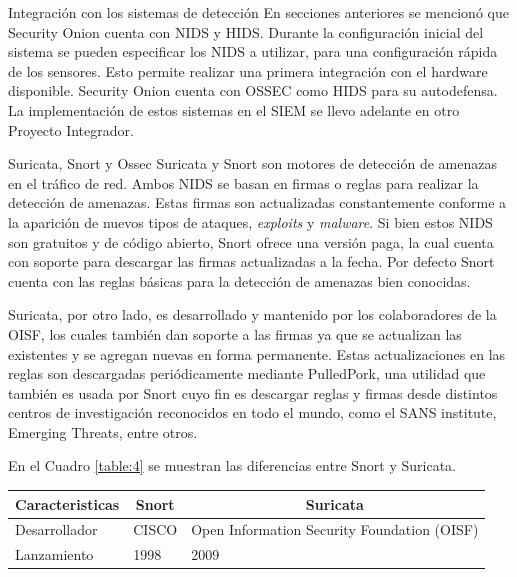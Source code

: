    \begin{section}{Integración con los sistemas de detección}
        En secciones anteriores se mencionó que Security Onion cuenta con NIDS y HIDS. Durante la configuración inicial del sistema se pueden especificar los NIDS a utilizar, para una configuración rápida de los sensores. Esto permite realizar una primera integración con el hardware disponible. Security Onion cuenta con OSSEC como HIDS para su autodefensa. La implementación de estos sistemas en el SIEM se llevo adelante en otro Proyecto Integrador.
   \end{section}
   \pagebreak
   \begin{subsection}{Suricata, Snort y Ossec}
        Suricata y Snort son motores de detección de amenazas en el tráfico de red. Ambos NIDS se basan en firmas o reglas para realizar la detección de amenazas. Estas firmas son actualizadas constantemente conforme a la aparición de nuevos tipos de ataques, \textit{exploits} y \textit{malware}. Si bien estos NIDS son gratuitos y de código abierto, Snort ofrece una versión paga, la cual cuenta con soporte para descargar las firmas actualizadas a la fecha. Por defecto Snort cuenta con las reglas básicas para la detección de amenazas bien conocidas. \par
    	Suricata, por otro lado, es desarrollado y mantenido por los colaboradores de la OISF, los cuales también dan soporte a las firmas ya que se actualizan las existentes y se agregan nuevas en forma permanente. Estas actualizaciones en las reglas son descargadas periódicamente mediante PulledPork, una utilidad que también es usada por Snort cuyo fin es descargar reglas y firmas desde distintos centros de investigación reconocidos en todo el mundo, como el SANS institute, Emerging Threats, entre otros. \par
        En el Cuadro \ref{table:4} se muestran las diferencias entre Snort y Suricata.
        \begin{table}[H]
            \centering
            \begin{tabular}{|m{10em}|m{11em}|m{11em}|}
                \hline 
               \multicolumn{1}{|c|}{Caracteristicas} & \multicolumn{1}{c|}{Snort} & \multicolumn{1}{c|}{Suricata}               \\ \hline %
                    Desarrollador & CISCO & Open Information Security Foundation (OISF)  \\ 
                \hline
                    Lanzamiento  & 1998 & 2009 \\ 

\end{tabular}
\end{table}
\end{subsection}
